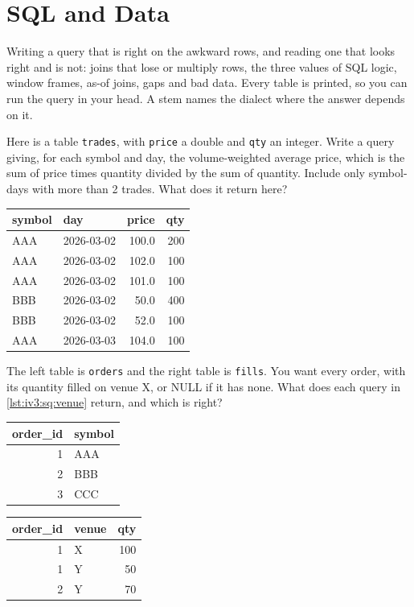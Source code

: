 \chapter{SQL and Data}\label{ch:iv3:sql-and-data}

\begin{ivtrains}
Writing a query that is right on the awkward rows, and reading one that looks right and is not: joins that lose or multiply rows, the three values of SQL logic, window frames, as-of joins, gaps and bad data. Every table is printed, so you can run the query in your head. A stem names the dialect where the answer depends on it.
\end{ivtrains}

\begin{question}\label{iq:iv3:sql-and-data:1}
Here is a table \texttt{trades}, with \texttt{price} a double and \texttt{qty} an integer. Write a query giving, for each symbol and day, the volume-weighted average price, which is the sum of price times quantity divided by the sum of quantity. Include only symbol-days with more than 2 trades. What does it return here?
\begin{center}\small
\begin{tabular}{llrr}
symbol & day & price & qty\\\hline
AAA & 2026-03-02 & 100.0 & 200\\
AAA & 2026-03-02 & 102.0 & 100\\
AAA & 2026-03-02 & 101.0 & 100\\
BBB & 2026-03-02 & 50.0 & 400\\
BBB & 2026-03-02 & 52.0 & 100\\
AAA & 2026-03-03 & 104.0 & 100
\end{tabular}
\end{center}
\end{question}

\begin{question}\label{iq:iv3:sql-and-data:2}
The left table is \texttt{orders} and the right table is \texttt{fills}. You want every order, with its quantity filled on venue X, or NULL if it has none. What does each query in \cref{lst:iv3:sq:venue} return, and which is right?
\begin{center}\small
\begin{tabular}{rl}
order\_id & symbol\\\hline
1 & AAA\\
2 & BBB\\
3 & CCC
\end{tabular}\qquad
\begin{tabular}{rlr}
order\_id & venue & qty\\\hline
1 & X & 100\\
1 & Y & 50\\
2 & Y & 70
\end{tabular}
\end{center}
\label{lst:iv3:sq:venue}
\end{question}

